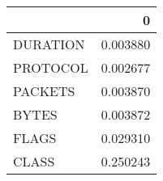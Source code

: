 \begin{tabular}{lr}
\toprule
{} &         0 \\
\midrule
DURATION &  0.003880 \\
PROTOCOL &  0.002677 \\
PACKETS  &  0.003870 \\
BYTES    &  0.003872 \\
FLAGS    &  0.029310 \\
CLASS    &  0.250243 \\
\bottomrule
\end{tabular}
